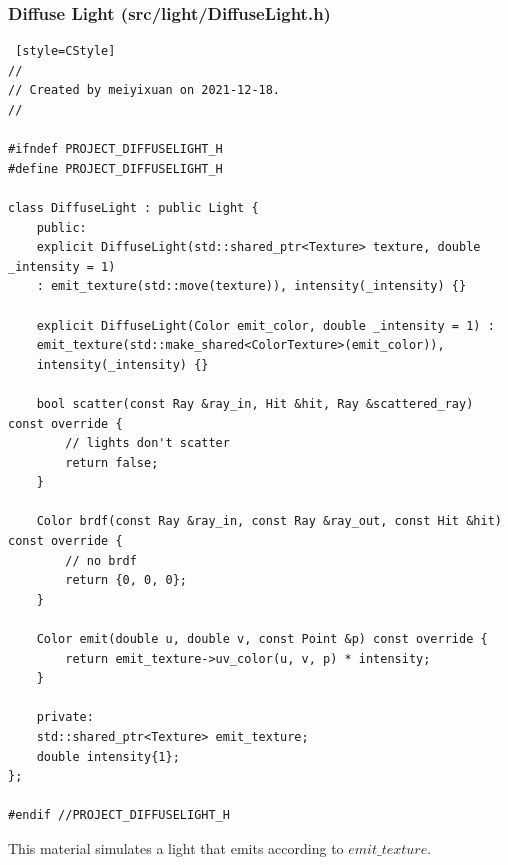 \documentclass[utf8]{article}
\begin{document}
\subsubsection{Diffuse Light (src/light/DiffuseLight.h)}
\begin{lstlisting} [style=CStyle]
//
// Created by meiyixuan on 2021-12-18.
//

#ifndef PROJECT_DIFFUSELIGHT_H
#define PROJECT_DIFFUSELIGHT_H

class DiffuseLight : public Light {
	public:
	explicit DiffuseLight(std::shared_ptr<Texture> texture, double _intensity = 1)
	: emit_texture(std::move(texture)), intensity(_intensity) {}
	
	explicit DiffuseLight(Color emit_color, double _intensity = 1) :
	emit_texture(std::make_shared<ColorTexture>(emit_color)),
	intensity(_intensity) {}
	
	bool scatter(const Ray &ray_in, Hit &hit, Ray &scattered_ray) const override {
		// lights don't scatter
		return false;
	}
	
	Color brdf(const Ray &ray_in, const Ray &ray_out, const Hit &hit) const override {
		// no brdf
		return {0, 0, 0};
	}
	
	Color emit(double u, double v, const Point &p) const override {
		return emit_texture->uv_color(u, v, p) * intensity;
	}
	
	private:
	std::shared_ptr<Texture> emit_texture;
	double intensity{1};
};

#endif //PROJECT_DIFFUSELIGHT_H

\end{lstlisting}
This material simulates a light that emits according to $emit\_texture$.
\end{document}

